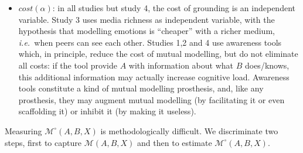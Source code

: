 \documentclass[natbib]{svjour3}
\newcommand{\ie}{{\textit{i.e.\ }}}
\newcommand{\model}[3]{{$\mathcal{M}(#1, #2, #3)$}}
\newcommand{\Model}[3]{{$\mathcal{M}^{\circ}(#1, #2, #3)$}}
\begin{document}
\begin{itemize}
    \item $cost(\alpha)$: in all studies but study 4, the cost of  grounding is
        an independent variable. Study 3 uses media richness as independent
        variable, with the hypothesis that modelling emotions is ``cheaper'' with a
        richer medium, \ie  when peers can see each other.  Studies 1,2 and 4
        use awareness tools which, in principle, reduce the cost of mutual modelling, but do
        not eliminate all costs: if the tool provide $A$ with information about
        what $B$ does/knows, this additional information may actually increase
        cognitive load. Awareness tools constitute a kind of mutual modelling prosthesis,
        and, like any prosthesis, they may augment mutual modelling (by facilitating it or
        even scaffolding it) or inhibit it (by making it useless).

\end{itemize}

Measuring \Model{A}{B}{X} is methodologically difficult. We
discriminate two steps, first to capture \model{A}{B}{X} and then to
estimate \Model{A}{B}{X}. 
\end{document}
